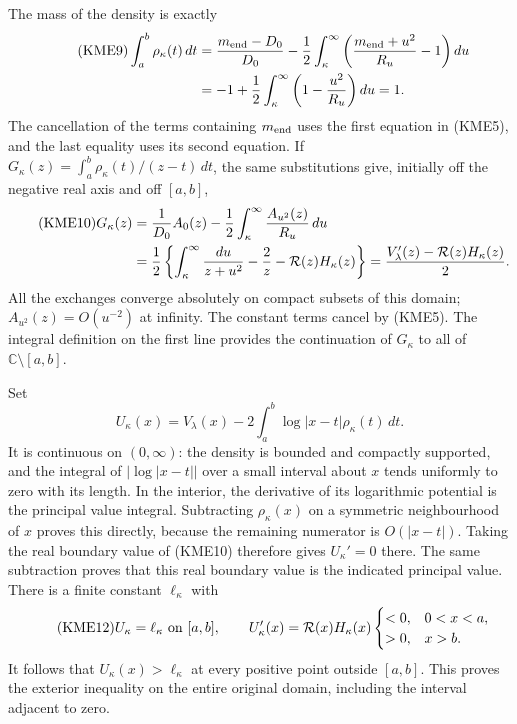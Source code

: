 The mass of the density is exactly
\begin{align}\tag{KME9}
 \int_a^b\rho_\kappa(t)\,dt
 &=\frac{m_{\rm end}-D_0}{D_0}
   -\frac12\int_\kappa^\infty\left(\frac{m_{\rm end}+u^2}{R_u}-1\right)du\\
 &=-1+\frac12\int_\kappa^\infty
                  \left(1-\frac{u^2}{R_u}\right)du=1.\notag
\end{align}
The cancellation of the terms containing $m_{\rm end}$ uses the first equation
in (KME5), and the last equality uses its second equation.
If $G_\kappa(z)=\int_a^b\rho_\kappa(t)/(z-t)\,dt$, the same substitutions give,
initially off the negative real axis and off $[a,b]$,
\begin{align}\tag{KME10}
 G_\kappa(z)&=\frac1{D_0}A_0(z)
                   -\frac12\int_\kappa^\infty\frac{A_{u^2}(z)}{R_u}\,du\\
 &=\frac12\left\{\int_\kappa^\infty\frac{du}{z+u^2}-\frac2z
                            -\mathcal R(z)H_\kappa(z)\right\}
   =\frac{V'_\lambda(z)-\mathcal R(z)H_\kappa(z)}2.\notag
\end{align}
All the exchanges converge absolutely on compact subsets of this
domain; $A_{u^2}(z)=O(u^{-2})$ at infinity. The constant terms cancel
by (KME5). The integral definition on the first line provides the
continuation of $G_\kappa$ to all of $\mathbb C\setminus[a,b]$.

Set
\begin{equation}\tag{KME11}
 U_\kappa(x)=V_\lambda(x)-2\int_a^b\log|x-t|\rho_\kappa(t)\,dt.
\end{equation}
It is continuous on $(0,\infty)$: the density is bounded and compactly
supported, and the integral of $|\log|x-t||$ over a small interval
about $x$ tends uniformly to zero with its length.  In the interior,
the derivative of its logarithmic potential is the principal value
integral. Subtracting $\rho_\kappa(x)$ on a symmetric neighbourhood of $x$
proves this directly, because the remaining numerator is $O(|x-t|)$.
Taking the real boundary value of (KME10) therefore gives $U_\kappa'=0$
there. The same subtraction proves that this real boundary value is
the indicated principal value. There is a finite constant $\ell_\kappa$ with
\begin{equation}\tag{KME12}
 U_\kappa=\ell_\kappa\ \hbox{on }[a,b],\qquad
 U_\kappa'(x)=\mathcal R(x)H_\kappa(x)
 \begin{cases}<0,&0<x<a,\\>0,&x>b.\end{cases}
\end{equation}
It follows that $U_\kappa(x)>\ell_\kappa$ at every positive point outside
$[a,b]$.  This proves the exterior inequality on the entire original
domain, including the interval adjacent to zero.

